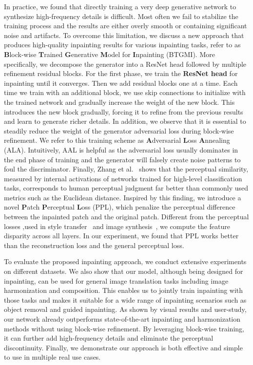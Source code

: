 In practice, we found that directly training a very deep generative network to synthesize high-frequency details is difficult. Most often we fail to stabilize the training process and the results are either overly smooth or containing significant noise and artifacts. To overcome this limitation, we discuss a new approach that produces high-quality inpainting results for various inpainting tasks, refer to as \textbf{B}lock-wise \textbf{T}rained \textbf{G}enerative \textbf{M}odel for \textbf{I}npainting (BTGMI). More specifically, we decompose the generator into a ResNet head followed by multiple refinement residual blocks. For the first phase, we train the \textbf{ResNet head} for inpainting until it converges. Then we add residual blocks one at a time. Each time we train with an additional block, we use skip connections to initialize with the trained network and gradually increase the weight of the new block. This introduces the new block gradually, forcing it to refine from the previous results and learn to generate richer details. In addition, we observe that it is essential to steadily reduce the weight of the generator adversarial loss during block-wise refinement. We refer to this training scheme as \textbf{A}dversarial \textbf{L}oss \textbf{A}nnealing (ALA).  Intuitively, AAL is helpful as the adversarial loss usually dominates in the end phase of training and the generator will falsely create noise patterns to foul the discriminator. Finally, Zhang et al.~\cite{zhang2018unreasonable} shows that the perceptual similarity, measured by internal activations of networks trained for high-level classification tasks, corresponds to human perceptual judgment far better than commonly used metrics such as the Euclidean distance. Inspired by this finding, we introduce a novel \textbf{P}atch \textbf{P}erceptual \textbf{L}oss (PPL), which penalize the perceptual difference between the inpainted patch and the original patch. Different from the perceptual losses ,used in style transfer~\cite{johnson2016perceptual,gatys2016image} and image synthesis~\cite{dosovitskiy2016generating,chen2017photographic}, we compute the feature disparity across all layers. In our experiment, we found that PPL works better than the reconstruction loss and the general perceptual loss. 

To evaluate the proposed inpainting approach, we conduct extensive experiments on different datasets. We also show that our model, although being designed for inpainting, can be used for general image translation tasks including image harmonization and composition. This enables us to jointly train inpainting with those tasks and makes it suitable for a wide range of inpainting scenarios such as object removal and guided inpainting. As shown by visual results and user-study, our network already outperforms state-of-the-art inpainting and harmonization methods without using block-wise refinement. By leveraging block-wise training, it can further add high-frequency details and eliminate the perceptual discontinuity. Finally, we demonstrate our approach is both effective and simple to use in multiple real use cases.

